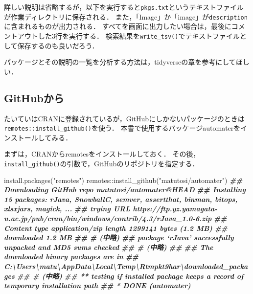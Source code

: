 \documentclass[
]{article}
\newenvironment{Shaded}{\begin{snugshade}}{\end{snugshade}}
\newcommand{\DocumentationTok}[1]{\textcolor[rgb]{0.56,0.35,0.01}{\textbf{\textit{#1}}}}
\newcommand{\FunctionTok}[1]{\textcolor[rgb]{0.00,0.00,0.00}{#1}}
\newcommand{\NormalTok}[1]{#1}
\newcommand{\SpecialCharTok}[1]{\textcolor[rgb]{0.00,0.00,0.00}{#1}}
\newcommand{\StringTok}[1]{\textcolor[rgb]{0.31,0.60,0.02}{#1}}
\begin{document}
詳しい説明は省略するが，以下を実行すると\texttt{pkgs.txt}というテキストファイルが作業ディレクトリに保存される．
また，「Image」か「image」が\texttt{description}に含まれるものが出力される．
すべてを画面に出力したい場合は，最後にコメントアウトした3行を実行する．
検索結果を\texttt{write\_tsv()}でテキストファイルとして保存するのも良いだろう．

パッケージとその説明の一覧を分析する方法は，tidyverseの章を参考にしてほしい．

\hypertarget{github}{%
\subsection{GitHubから}\label{github}}

たいていはCRANに登録されているが，GitHubにしかないパッケージのときは\texttt{remotes::install\_github()}を使う．
本書で使用するパッケージautomaterをインストールしてみる．

まずは，CRANからremotesをインストールしておく．
その後，\texttt{install\_github()}の引数で，GitHubのリポジトリを指定する．

\begin{Shaded}
\begin{Highlighting}[]
\FunctionTok{install.packages}\NormalTok{(}\StringTok{"remotes"}\NormalTok{)}
\NormalTok{remotes}\SpecialCharTok{::}\FunctionTok{install\_github}\NormalTok{(}\StringTok{"matutosi/automater"}\NormalTok{)}
\DocumentationTok{\#\# Downloading GitHub repo matutosi/automater@HEAD}
\DocumentationTok{\#\# Installing 15 packages: rJava, SnowballC, semver, assertthat, binman, bitops, xlsxjars, magick, ...}
\DocumentationTok{\#\# trying URL \textquotesingle{}https://ftp.yz.yamagata{-}u.ac.jp/pub/cran/bin/windows/contrib/4.3/rJava\_1.0{-}6.zip\textquotesingle{}}
\DocumentationTok{\#\# Content type \textquotesingle{}application/zip\textquotesingle{} length 1299141 bytes (1.2 MB)}
\DocumentationTok{\#\# downloaded 1.2 MB}
\DocumentationTok{\#\# \# (中略)}
\DocumentationTok{\#\# package ‘rJava’ successfully unpacked and MD5 sums checked}
\DocumentationTok{\#\# \# (中略)}
\DocumentationTok{\#\# }
\DocumentationTok{\#\# The downloaded binary packages are in}
\DocumentationTok{\#\#         C:\textbackslash{}Users\textbackslash{}matu\textbackslash{}AppData\textbackslash{}Local\textbackslash{}Temp\textbackslash{}Rtmpkt9har\textbackslash{}downloaded\_packages}
\DocumentationTok{\#\# \# (中略)}
\DocumentationTok{\#\# ** testing if installed package keeps a record of temporary installation path}
\DocumentationTok{\#\# * DONE (automater)}
\end{Highlighting}
\end{Shaded}
\end{document}
